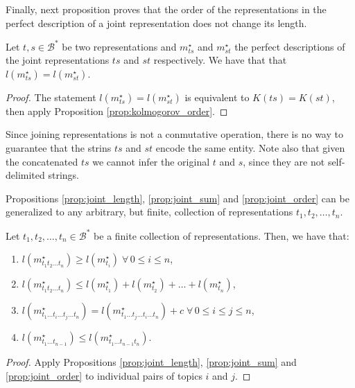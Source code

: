 Finally, next proposition proves that the order of the representations in the perfect description of a joint representation does not change its length.

\begin{proposition}
\label{prop:joint_order}
Let $t,s \in \mathcal{B}^\ast$ be two representations and $m_{ts}^{\star}$ and $m_{st}^{\star}$ the perfect descriptions of the joint representations $ts$ and $st$ respectively. We have that that $l \left( m_{ts}^{\star} \right) = l \left( m_{st}^{\star} \right)$.
\end{proposition}
\begin{proof}
The statement $l \left( m_{ts}^{\star} \right) = l \left( m_{st}^{\star} \right)$ is equivalent to $K(ts) = K(st)$, then apply Proposition \ref{prop:kolmogorov_order}.
\end{proof}

Since joining representations is not a conmutative operation, there is no way to guarantee that the strins $ts$ and $st$ encode the same entity. Note also that given the concatenated $ts$ we cannot infer the original $t$ and $s$, since they are not self-delimited strings.

Propositions \ref{prop:joint_length}, \ref{prop:joint_sum} and \ref{prop:joint_order} can be generalized to any arbitrary, but finite, collection of representations $t_1, t_2, \ldots, t_n$.

\begin{proposition}
\label{prop:joint_multiple_topics}
Let $t_1, t_2, \ldots, t_n \in \mathcal{B}^\ast$ be a finite collection of representations. Then, we have that:

\renewcommand{\theenumi}{\roman{enumi}}
\begin{enumerate}
\item $l(m_{t_1 t_2 \ldots t_n}^\star) \geq l(m_ {t_i}^\star) \; \forall \, 0 \leq i \leq n$,
\item $l(m_{t_1 t_2 \ldots t_n}^\star) \leq l(m_ {t_1}^\star) + l(m_ {t_2}^\star) + \ldots + l(m_ {t_n}^\star)$,
\item $l(m_{t_1 \ldots t_i \ldots t_j \ldots t_n}^\star) = l(m_{t_1 \ldots t_j \ldots t_i \ldots t_n}^\star) + c \; \forall \, 0 \leq i \leq j \leq n$,
\item $l(m_{t_1 \ldots t_{n-1}}^\star) \leq l(m_{t_1 \ldots t_{n-1} t_n}^\star)$.
\end{enumerate}
\end{proposition}
\begin{proof}
Apply Propositions \ref{prop:joint_length}, \ref{prop:joint_sum} and \ref{prop:joint_order} to individual pairs of topics $i$ and $j$.
\end{proof}

